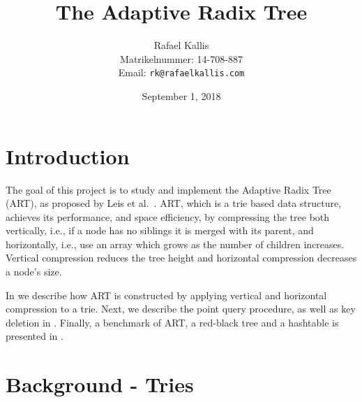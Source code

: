 \documentclass[abstracton,12pt]{scrartcl}
\title{The Adaptive Radix Tree}
\author{
    Rafael Kallis\\[-5pt]
    \scriptsize Matrikelnummer: 14-708-887\\[-5pt]
    \scriptsize Email: \texttt{rk@rafaelkallis.com}
}
\date{\vspace*{2cm}September 1, 2018}
\theoremstyle{definition}
\begin{document}
\maketitle





\newpage
\section{Introduction}


The goal of this project is to study and implement the Adaptive Radix Tree 
(ART), as proposed by Leis et al.\ \cite{leis2013adaptive}.
ART, which is a trie based data structure, achieves its performance, and space
efficiency, by compressing the tree both vertically, i.e., if a node has no 
siblings it is merged with its parent, and horizontally, i.e., use an array
which grows as the number of children increases.
Vertical compression reduces the tree height and horizontal compression
decreases a node's size.

In  we describe how ART is constructed by applying 
vertical and horizontal compression to a trie.
Next, we describe the point query procedure, as well as 
key deletion in .
Finally, a benchmark of ART, a red-black tree and a hashtable
is presented in .

\section{Background - Tries}\label{sec:preliminaries}
\end{document}

